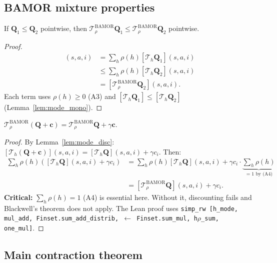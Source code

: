 \subsection{BAMOR mixture properties}

\begin{lemma}
If $\mathbf{Q}_1 \le \mathbf{Q}_2$ pointwise, then $\mathcal{T}^{\mathrm{BAMOR}}_\rho \mathbf{Q}_1 \le \mathcal{T}^{\mathrm{BAMOR}}_\rho \mathbf{Q}_2$ pointwise.
\end{lemma}
\begin{proof}
\begin{align}
[\mathcal{T}^{\mathrm{BAMOR}}_\rho \mathbf{Q}_1](s,a,i)
&= \sum_h \rho(h) [\mathcal{T}_h \mathbf{Q}_1](s,a,i) \\
&\le \sum_h \rho(h) [\mathcal{T}_h \mathbf{Q}_2](s,a,i) \\
&= [\mathcal{T}^{\mathrm{BAMOR}}_\rho \mathbf{Q}_2](s,a,i).
\end{align}
Each term uses $\rho(h) \ge 0$ (A3) and $[\mathcal{T}_h \mathbf{Q}_1] \le [\mathcal{T}_h \mathbf{Q}_2]$ (Lemma~\ref{lem:mode_mono}).
\end{proof}

\begin{lemma}
$\mathcal{T}^{\mathrm{BAMOR}}_\rho(\mathbf{Q} + \mathbf{c}) = \mathcal{T}^{\mathrm{BAMOR}}_\rho \mathbf{Q} + \gamma\mathbf{c}$.
\end{lemma}
\begin{proof}
By Lemma~\ref{lem:mode_disc}: $[\mathcal{T}_h(\mathbf{Q} + \mathbf{c})](s,a,i) = [\mathcal{T}_h \mathbf{Q}](s,a,i) + \gamma c_i$.  Then:
\begin{align}
    \sum_h \rho(h)([\mathcal{T}_h \mathbf{Q}](s,a,i) + \gamma c_i) &= \sum_h \rho(h)[\mathcal{T}_h \mathbf{Q}](s,a,i) + \gamma c_i \cdot \underbrace{\sum_h \rho(h)}_{=1 \text{ by (A4)}} \\
    &= [\mathcal{T}^{\mathrm{BAMOR}}_\rho \mathbf{Q}](s,a,i) + \gamma c_i.
\end{align}
\textbf{Critical:} $\sum_h \rho(h) = 1$ (A4) is essential here.  Without it, discounting fails and Blackwell's theorem does not apply.  The Lean proof uses \texttt{simp\_rw [h\_mode, mul\_add, Finset.sum\_add\_distrib, $\leftarrow$ Finset.sum\_mul, h$\rho$\_sum, one\_mul]}.
\end{proof}

\subsection{Main contraction theorem}

